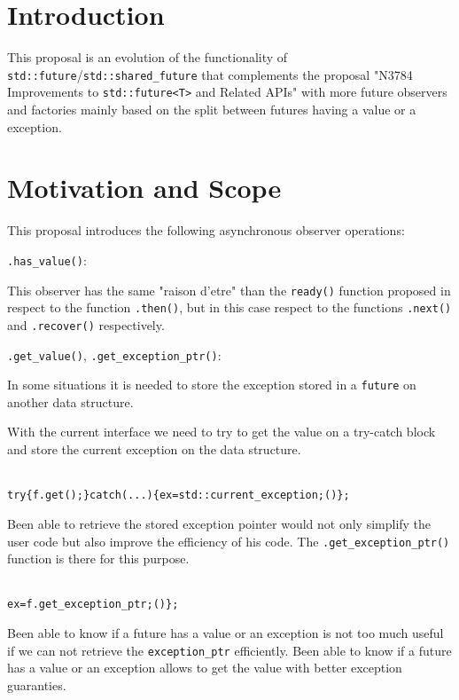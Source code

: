 \documentclass[a4paper,10pt]{article}
\newcommand{\cpp}[1]{\lstinline{#1}}
\newcommand{\suppress}[1]{\colorbox{suppress_color}{#1}}
\newcommand{\update}[1]{\colorbox{update_color}{#1}}
\begin{document}
\section{Introduction}

This proposal is an evolution of the functionality of \cpp{std::future}/\cpp{std::shared_future} that complements the proposal "N3784 Improvements to \cpp{std::future<T>} and Related APIs"  \cite{N3784} with more future observers and factories mainly based on the split between futures having a value or a exception.

\section{Motivation and Scope}

This proposal introduces the following asynchronous observer operations:

\cpp{.has_value()}:

This observer has the same "raison d'etre" than the \cpp{ready()} function proposed in  \cite{N3784} respect to the function \cpp{.then()}, but in this case respect to the functions \cpp{.next()} and \cpp{.recover()} respectively.

\suppress{\cpp{.get_value()},} \cpp{.get_exception_ptr()}:

\update{
In some situations it is needed to store the exception stored in a \cpp{future} on another data structure. 
}

\update{
With the current interface we need to try to get the value on a try-catch block and store the current exception on the data structure. 
}
\begin{alltt}
\update{
try \{ f.get(); \} catch(...) \{ ex = std::current_exception;() \};
}
\end{alltt}

\update{Been able to retrieve the stored exception pointer would not only simplify the user code but also improve the efficiency of his code. The \cpp{.get_exception_ptr()} function is there for this purpose.
}

\begin{alltt}
\update{
ex = f.get_exception_ptr;() \};
}
\end{alltt}
 
\suppress{Been able to know if a future has a value or an exception is not too much useful if we can not retrieve the \cpp{exception_ptr} efficiently. Been able to know if a future has a value or an exception allows to get the value with better exception guaranties.}
\end{document}
